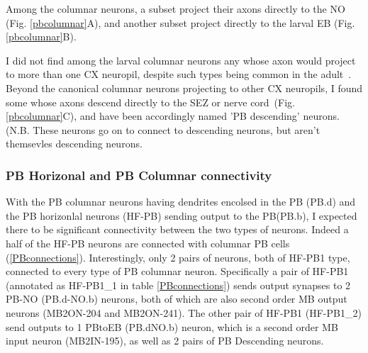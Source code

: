    Among the columnar neurons, a subset project their axons directly to the NO (Fig. \ref{pbcolumnar}A), and another subset project directly to the larval EB (Fig. \ref{pbcolumnar}B).

    I did not find among the larval columnar neurons any whose axon would project to more than one CX neuropil, despite such types being common in the adult~\citep{wolff2015neuroarchitecture, wolff2018neuroarchitecture, hulse2021connectome}.
    Beyond the canonical columnar neurons projecting to other CX neuropils, I found some whose axons descend directly to the SEZ or nerve cord~(Fig. \ref{pbcolumnar}C), and have been accordingly named 'PB descending' neurons. (N.B. These neurons go on to connect to descending neurons, but aren't themsevles descending neurons.

    \subsubsection{PB Horizonal and PB Columnar connectivity}
    With the PB columnar neurons having dendrites encolsed in the PB (PB.d) and the PB horizonlal neurons (HF-PB) sending output to the PB(PB.b), I expected there to be significant connectivity between the two types of neurons. Indeed a half of the HF-PB neurons are connected with columnar PB cells (\ref{PBconnections}).  Interestingly, only 2 pairs of neurons, both of HF-PB1 type, connected to every type of PB columnar neuron. Specifically a pair of HF-PB1 (annotated as HF-PB1\_1 in table \ref{PBconnections}) sends output synapses to 2 PB-NO (PB.d-NO.b) neurons, both of which are also second order MB output neurons (MB2ON-204 and MB2ON-241). The other pair of  HF-PB1 (HF-PB1\_2) send outputs to 1 PBtoEB (PB.dNO.b) neuron, which is a second order MB input neuron (MB2IN-195), as well as 2 pairs of PB Descending neurons. 


